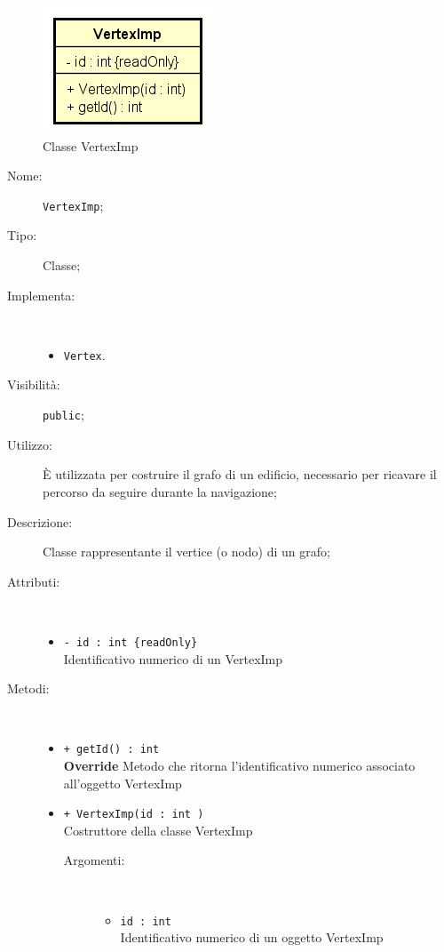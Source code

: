 \documentclass[../DefinizioneDiProdotto.tex]{subfiles}
\begin{document}
    \begin{figure}[H]
        \centering
        \includegraphics{img/VertexImp.png}
        \caption{Classe VertexImp}\label{fig:model::navigator::graph::vertex::VertexImp} 
    \end{figure}
    \begin{description}
\item[Nome:] \texttt{VertexImp};
\item[Tipo:] Classe;
\item[Implementa:] \
\begin{itemize}
\item \texttt{Vertex}.

\end{itemize}
\item[Visibilità:] \texttt{public};
\item[Utilizzo:] È utilizzata per costruire il grafo di un edificio, necessario per ricavare il percorso da seguire durante la navigazione;
\item[Descrizione:] Classe rappresentante il vertice (o nodo) di un grafo;
\item[Attributi:] \
\begin{itemize}
\item \texttt{- id  : int \{readOnly\}}\\
Identificativo numerico di un VertexImp

\end{itemize}
\item[Metodi:] \
\begin{itemize}
\item \texttt{+ getId() : int}\\
\textbf{Override} Metodo che ritorna l'identificativo numerico associato all'oggetto VertexImp
 \item \texttt{+ VertexImp(id : int )}\\
Costruttore della classe VertexImp
 \begin{description}
\item[Argomenti:] \
\begin{itemize}
\item \texttt{id : int }\\
Identificativo numerico di un oggetto VertexImp\end{itemize}
\end{description}
\end{itemize}
\end{description}
\end{document}
